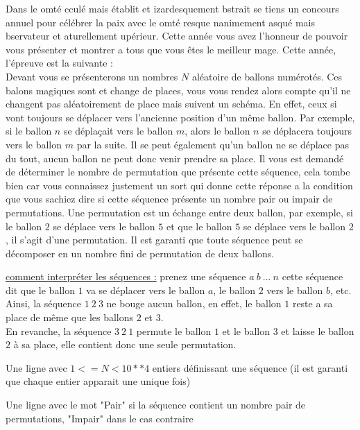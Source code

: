 \problemname{\problemyamlname}


\newcommand{\maxn}{10^4}  %

Dans le omté cculé mais établit et izardesquement bstrait se tiens un concours annuel pour célébrer la paix avec le omté resque nanimement asqué mais bservateur et aturellement upérieur.
Cette année vous avez l'honneur de pouvoir vous présenter et montrer a tous que vous êtes le meilleur mage. Cette année, l'épreuve est la suivante : \\

Devant vous se présenterons un nombres $N$ aléatoire de ballons numérotés. Ces balons magiques sont et change de places, vous vous rendez alors compte qu'il ne changent pas aléatoirement de place mais suivent un schéma. En effet, ceux si vont toujours se déplacer vers l'ancienne position d'un même ballon.
Par exemple, si le ballon $n$ se déplaçait vers le ballon $m$, alors le ballon $n$ se déplacera toujours vers le ballon $m$ par la suite. Il se peut également qu'un ballon ne se déplace pas du tout, aucun ballon ne peut donc venir prendre sa place.
Il vous est demandé de déterminer le nombre de permutation que présente cette séquence, cela tombe bien car vous connaissez justement un sort qui donne cette réponse a la condition que vous sachiez dire si cette séquence présente un nombre pair ou impair de permutations.
Une permutation est un échange entre deux ballon, par exemple, si le ballon $2$ se déplace vers le ballon $5$ et que le ballon $5$ se déplace vers le ballon $2$, il s'agit d'une permutation.
Il est garanti que toute séquence peut se décomposer en un nombre fini de permutation de deux ballons.

\underline{comment interpréter les séquences :} prenez une séquence $a\ b\ ...\ n$ cette séquence dit que le ballon $1$ va se déplacer vers le ballon $a$, le ballon $2$ vers le ballon $b$, etc.\\
Ainsi, la séquence $1\ 2\ 3$ ne bouge aucun ballon, en effet, le ballon $1$ reste a sa place de même que les ballons $2$ et $3$.\\
En revanche, la séquence $3\ 2\ 1$ permute le ballon $1$ et le ballon $3$ et laisse le ballon $2$ à sa place, elle contient donc une seule permutation.

\begin{Input}
    \begin{Itemize}
        \item Une ligne avec $1 <= N < 10**4$ entiers définissant une séquence (il est garanti que chaque entier apparait une unique fois)
    \end{Itemize}
\end{Input}

\begin{Output}
    \begin{Itemize}
        \item Une ligne avec le mot "Pair" si la séquence contient un nombre pair de permutations, "Impair" dans le cas contraire
    \end{Itemize}
\end{Output}
